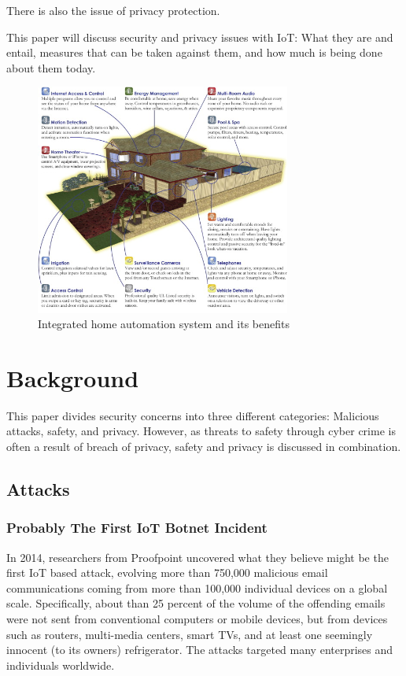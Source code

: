 \documentclass[a4paper, conference]{IEEEtran/IEEEtran}
\begin{document}
There is also the issue of privacy protection.

This paper will discuss security and privacy issues with IoT\@: What they are and entail, measures that can be taken against them, and how much is being done about them today.

\begin{figure}[!t]
\centering
\includegraphics[width=3.3in]{assets/raspberry.jpg}
\caption{Integrated home automation system and its benefits}
\label{fig:raspberry}
\end{figure}

\section{Background}
This paper divides security concerns into three different categories: Malicious attacks, safety, and privacy. However, as threats to safety through cyber crime is often a result of breach of privacy, safety and privacy is discussed in combination. 

\subsection{Attacks}
\subsubsection{Probably The First IoT Botnet Incident}
In 2014, researchers from Proofpoint uncovered what they believe might be the first IoT based attack, evolving more than 750,000 malicious email communications coming from more than 100,000 individual devices on a global scale.\cite{proofpoint} Specifically, about than 25 percent of the volume of the offending emails were not sent from conventional computers or mobile devices, but from devices such as routers, multi-media centers, smart TVs, and at least one seemingly innocent (to its owners) refrigerator. The attacks targeted many enterprises and individuals worldwide.
\end{document}
